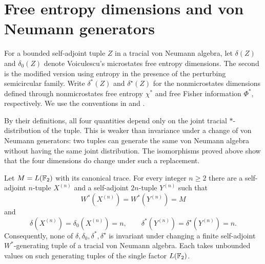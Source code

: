 \section{Free entropy dimensions and von Neumann generators}
\label{sec:entropy-dimensions}

For a bounded self-adjoint tuple $Z$ in a tracial von Neumann algebra,
let $\delta(Z)$ and $\delta_0(Z)$ denote Voiculescu's microstates free
entropy dimensions. The second is the modified version using entropy
in the presence of the perturbing semicircular family. Write $\delta^*(Z)$
and $\delta^\star(Z)$ for the nonmicrostates dimensions defined through
nonmicrostates free entropy $\chi^*$ and free Fisher information
$\Phi^*$, respectively. We use the conventions in
\cite[Section~2.4]{voiculescu2002entropy} and
\cite[Section~4.1.1]{connes_shlyakhtenko2005}.

By their definitions, all four quantities depend only on the joint
tracial $*$-distribution of the tuple. This is weaker than invariance
under a change of von Neumann generators: two tuples can generate the
same von Neumann algebra without having the same joint distribution.
The isomorphisms proved above show that the four dimensions do change
under such a replacement.

\begin{corollary}
\label{cor:entropy-dimensions}
Let $M=L(\mathbb F_2)$ with its canonical trace. For every integer $n\geq2$
there are a self-adjoint $n$-tuple $X^{(n)}$ and a self-adjoint
$2n$-tuple $Y^{(n)}$ such that
\[
 W^*(X^{(n)})=W^*(Y^{(n)})=M
\]
and
\[
 \delta(X^{(n)})=\delta_0(X^{(n)})=n,
 \qquad
 \delta^*(Y^{(n)})=\delta^\star(Y^{(n)})=n.
\]
Consequently, none of $\delta,\delta_0,\delta^*,\delta^\star$ is
invariant under changing a finite self-adjoint $W^*$-generating tuple
of a tracial von Neumann algebra. Each takes unbounded values on such
generating tuples of the single factor $L(\mathbb F_2)$.
\end{corollary}

